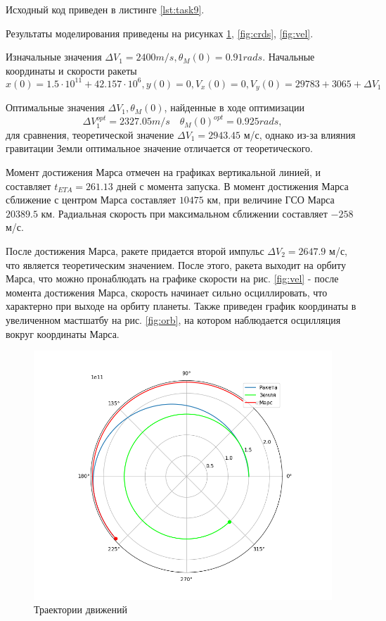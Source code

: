 Исходный код приведен в листинге \ref{lst:task9}.

Результаты моделирования приведены на рисунках \ref{fig:trj}, \ref{fig:crds}, \ref{fig:vel}.

Изначальные значения $\Delta V_1=2400 m/s, \theta_M(0)=0.91 rads$. Начальные координаты и скорости ракеты
\begin{equation}
	x(0) = 1.5 \cdot 10^{11} + 42.157 \cdot 10^6, y(0) = 0, V_x(0)=0, V_y(0) = 29783 + 3065 + \Delta V_1
\end{equation}

Оптимальные значения $\Delta V_1, \theta_M(0)$, найденные в ходе оптимизации
\begin{equation}
	\Delta V_1^{opt} = 2327.05 m/s \quad \theta_M(0)^{opt} = 0.925 rads,
\end{equation}
для сравнения, теоретической значение $\Delta V_1=2943.45$ м/с, однако из-за влияния гравитации Земли
оптимальное значение отличается от теоретического.

Момент достижения Марса отмечен на графиках вертикальной линией, и составляет $t_{ETA} = 261.13$ дней с момента запуска.
В момент достижения Марса сближение с центром Марса составляет $10475$ км, при величине ГСО Марса $20389.5$ км. Радиальная скорость
при максимальном сближении составляет $-258$ м/с.

После достижения Марса, ракете придается второй импульс $\Delta V_2 = 2647.9$ м/с, что является теоретическим значением.
После этого, ракета выходит на орбиту Марса, что можно пронаблюдать на графике скорости на рис. \ref{fig:vel} - после момента достижения Марса,
скорость начинает сильно осциллировать, что характерно при выходе на орбиту планеты. Также приведен график координаты в увеличенном мастшатбу на рис. 
\ref{fig:orb}, на котором наблюдается осцилляция вокруг координаты Марса.

\begin{figure}
	\center
	\includegraphics[width=.8\linewidth]{imgs_9/trj.png}
	\caption{Траектории движений}
	\label{fig:trj}
\end{figure}

